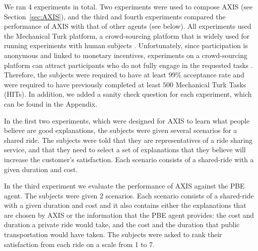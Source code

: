 \documentclass[letterpaper]{article} %
\begin{document}
We ran 4 experiments in total. Two experiments were used to compose AXIS (see Section~\ref{sec:AXIS}), and the third and fourth experiments compared the performance of AXIS with that of other agents (see below).
All experiments used the Mechanical Turk platform, a crowd-sourcing platform that is widely used for running experiments with human subjects \cite{amir2012economic,paolacci2010running}.
Unfortunately, since participation is anonymous and linked to monetary incentives, experiments on a crowd-sourcing platform can attract participants who do not fully engage in the requested tasks \cite{turner2012using}. Therefore, the subjects were required to have at least $99\%$ acceptance rate and were required to have previously completed at least $500$ Mechanical Turk Tasks (HITs). In addition, we added a sanity check question for each experiment, which can be found in the Appendix.

In the first two experiments, which were designed for AXIS to learn what people believe are good explanations, the subjects were given several scenarios for a shared ride. The subjects were told that they are representatives of a ride sharing service, and that they need to select a set of explanations that they believe will increase the customer's satisfaction. Each scenario consists of a shared-ride with a given duration and cost.

In the third experiment we evaluate the performance of AXIS against the PBE agent. %
The subjects were given $2$ scenarios. Each scenario consists of a shared-ride with a given duration and cost and it also contains either the explanations that are chosen by AXIS or the information that the PBE agent provides:
the cost and duration a private ride would take, and the cost and the duration that public transportation would have taken. The subjects were asked to rank their satisfaction from each ride on a scale from 1 to 7.
\end{document}
